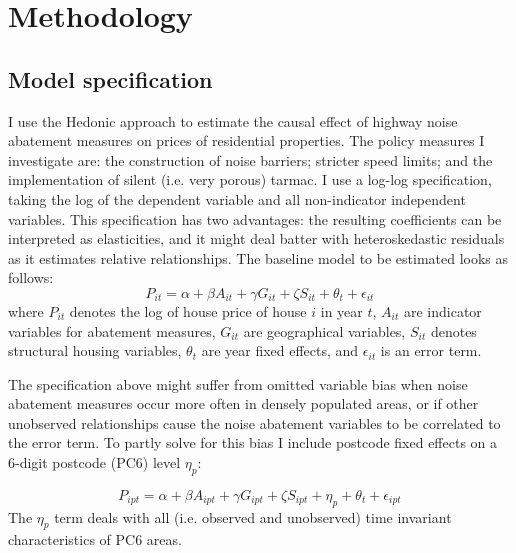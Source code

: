 \documentclass[12pt,a4paper]{scrartcl}
\begin{document}
	\section{Methodology}
	\label{sec:method}
	
		\subsection{Model specification}	
		I use the Hedonic approach to estimate the causal effect of highway noise abatement measures on prices of residential properties. The policy measures I investigate are: the construction of noise barriers; stricter speed limits; and the implementation of silent (i.e. very porous) tarmac. I use a log-log specification, taking the log of the dependent variable and all non-indicator independent variables. This specification has two advantages: the resulting coefficients can be interpreted as elasticities, and it might deal batter with heteroskedastic residuals as it estimates relative relationships. The baseline model to be estimated looks as follows:
			\begin{equation}
			\label{spec:baseline}
			P_{it} = \alpha + \beta A_{it} + \gamma G_{it} + \zeta S_{it} + \theta_{t} + \epsilon_{it}
			\end{equation}
		where $P_{it}$ denotes the log of house price of house $i$ in year $t$, $A_{it}$ are indicator variables for abatement measures, $G_{it}$ are geographical variables, $S_{it}$ denotes structural housing variables, $\theta_{t}$ are year fixed effects, and $\epsilon_{it}$ is an error term.
	
		The specification above might suffer from omitted variable bias when noise abatement measures occur more often in densely populated areas, or if other unobserved relationships cause the noise abatement variables to be correlated to the error term. To partly solve for this bias I include postcode fixed effects on a 6-digit postcode (PC6) level $\eta_p$:
	
			\begin{equation}
			\label{spec:fe}
			P_{ipt} = \alpha + \beta A_{ipt} + \gamma G_{ipt} + \zeta S_{ipt} + \eta_{p} + \theta_{t} + \epsilon_{ipt}
			\end{equation}
		The $\eta_p$ term deals with all (i.e. observed and unobserved) time invariant characteristics of PC6 areas.
	
\end{document}
